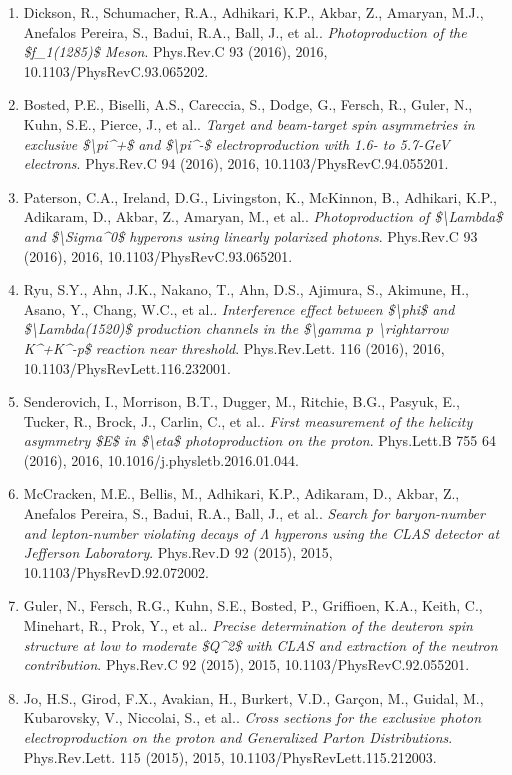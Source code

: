 \begin{enumerate}
\item Dickson, R., Schumacher, R.A., Adhikari, K.P., Akbar, Z., Amaryan, M.J., Anefalos Pereira, S., Badui, R.A., Ball, J., et al.. \textit{Photoproduction of the \$f\_1(1285)\$ Meson}. Phys.Rev.C 93 (2016), 2016, 10.1103/PhysRevC.93.065202.
\item Bosted, P.E., Biselli, A.S., Careccia, S., Dodge, G., Fersch, R., Guler, N., Kuhn, S.E., Pierce, J., et al.. \textit{Target and beam-target spin asymmetries in exclusive \$\textbackslash{}pi\textasciicircum{}+\$ and \$\textbackslash{}pi\textasciicircum{}-\$ electroproduction with 1.6- to 5.7-GeV electrons}. Phys.Rev.C 94 (2016), 2016, 10.1103/PhysRevC.94.055201.
\item Paterson, C.A., Ireland, D.G., Livingston, K., McKinnon, B., Adhikari, K.P., Adikaram, D., Akbar, Z., Amaryan, M., et al.. \textit{Photoproduction of \$\textbackslash{}Lambda\$ and \$\textbackslash{}Sigma\textasciicircum{}0\$ hyperons using linearly polarized photons}. Phys.Rev.C 93 (2016), 2016, 10.1103/PhysRevC.93.065201.
\item Ryu, S.Y., Ahn, J.K., Nakano, T., Ahn, D.S., Ajimura, S., Akimune, H., Asano, Y., Chang, W.C., et al.. \textit{Interference effect between \$\textbackslash{}phi\$ and \$\textbackslash{}Lambda(1520)\$ production channels in the \$\textbackslash{}gamma p \textbackslash{}rightarrow K\textasciicircum{}+K\textasciicircum{}-p\$ reaction near threshold}. Phys.Rev.Lett. 116 (2016), 2016, 10.1103/PhysRevLett.116.232001.
\item Senderovich, I., Morrison, B.T., Dugger, M., Ritchie, B.G., Pasyuk, E., Tucker, R., Brock, J., Carlin, C., et al.. \textit{First measurement of the helicity asymmetry \$E\$ in \$\textbackslash{}eta\$ photoproduction on the proton}. Phys.Lett.B 755 64 (2016), 2016, 10.1016/j.physletb.2016.01.044.
\item McCracken, M.E., Bellis, M., Adhikari, K.P., Adikaram, D., Akbar, Z., Anefalos Pereira, S., Badui, R.A., Ball, J., et al.. \textit{Search for baryon-number and lepton-number violating decays of Λ hyperons using the CLAS detector at Jefferson Laboratory}. Phys.Rev.D 92 (2015), 2015, 10.1103/PhysRevD.92.072002.
\item Guler, N., Fersch, R.G., Kuhn, S.E., Bosted, P., Griffioen, K.A., Keith, C., Minehart, R., Prok, Y., et al.. \textit{Precise determination of the deuteron spin structure at low to moderate \$Q\textasciicircum{}2\$ with CLAS and extraction of the neutron contribution}. Phys.Rev.C 92 (2015), 2015, 10.1103/PhysRevC.92.055201.
\item Jo, H.S., Girod, F.X., Avakian, H., Burkert, V.D., Garçon, M., Guidal, M., Kubarovsky, V., Niccolai, S., et al.. \textit{Cross sections for the exclusive photon electroproduction on the proton and Generalized Parton Distributions}. Phys.Rev.Lett. 115 (2015), 2015, 10.1103/PhysRevLett.115.212003.

\end{enumerate}
